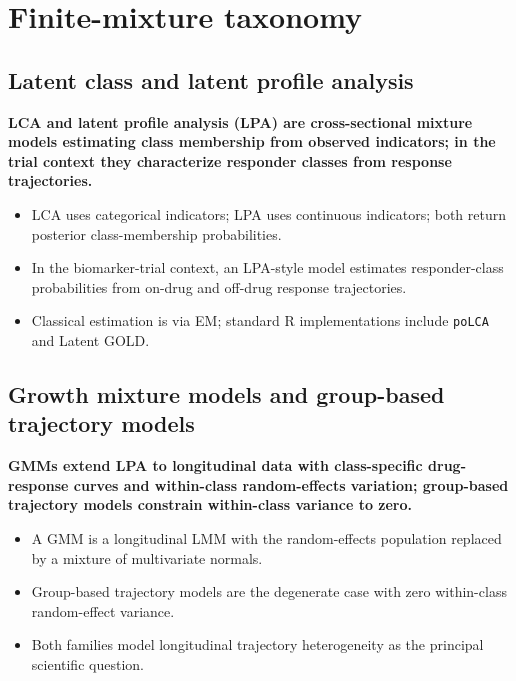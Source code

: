 \documentclass[
  11pt,
]{article}
\begin{document}
\section{Finite-mixture taxonomy}\label{finite-mixture-taxonomy}

\subsection{Latent class and latent profile analysis}\label{latent-class-and-latent-profile-analysis}

\textbf{LCA and latent profile analysis (LPA) are cross-sectional
mixture models estimating
class membership from observed indicators; in the trial context they
characterize responder classes from response trajectories.}

\begin{itemize}\setlength{\itemsep}{2pt}\setlength{\parskip}{0pt}
\item LCA uses categorical indicators; LPA uses continuous indicators;
  both return posterior class-membership probabilities.
\item In the biomarker-trial context, an LPA-style model estimates
  responder-class probabilities from on-drug and off-drug response
  trajectories.
\item Classical estimation is via EM; standard R implementations
  include \texttt{poLCA} and Latent GOLD.
\end{itemize}

\subsection{Growth mixture models and group-based trajectory models}\label{growth-mixture-models-and-group-based-trajectory-models}

\textbf{GMMs extend LPA to longitudinal data with class-specific
drug-response curves and within-class random-effects variation;
group-based trajectory models constrain within-class variance to zero.}

\begin{itemize}\setlength{\itemsep}{2pt}\setlength{\parskip}{0pt}
\item A GMM is a longitudinal LMM with the random-effects population
  replaced by a mixture of multivariate normals.
\item Group-based trajectory models are the degenerate case with zero
  within-class random-effect variance.
\item Both families model longitudinal trajectory heterogeneity as
  the principal scientific question.
\end{itemize}
\end{document}
